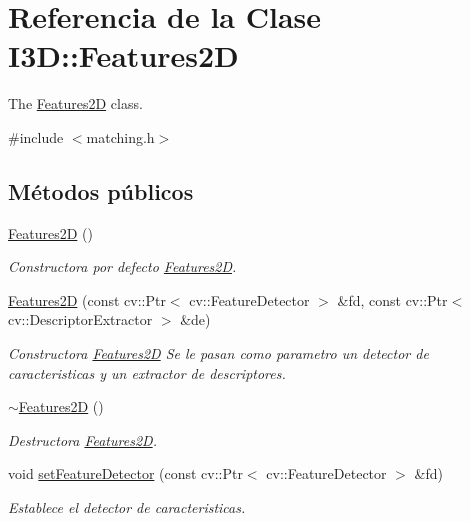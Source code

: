 \hypertarget{class_i3_d_1_1_features2_d}{}\section{Referencia de la Clase I3D\+:\+:Features2D}
\label{class_i3_d_1_1_features2_d}


The \hyperlink{class_i3_d_1_1_features2_d}{Features2D} class.  




{\ttfamily \#include $<$matching.\+h$>$}

\subsection*{Métodos públicos}
\begin{DoxyCompactItemize}
\item 
\hyperlink{class_i3_d_1_1_features2_d_a14b2aca15beaeb0bf20874246022bdf3}{Features2D} ()
\begin{DoxyCompactList}\small\item\em Constructora por defecto \hyperlink{class_i3_d_1_1_features2_d}{Features2D}. \end{DoxyCompactList}\item 
\hyperlink{class_i3_d_1_1_features2_d_a0daae1513e7dfdeb6fbed6f188a0ffb6}{Features2D} (const cv\+::\+Ptr$<$ cv\+::\+Feature\+Detector $>$ \&fd, const cv\+::\+Ptr$<$ cv\+::\+Descriptor\+Extractor $>$ \&de)
\begin{DoxyCompactList}\small\item\em Constructora \hyperlink{class_i3_d_1_1_features2_d}{Features2D} Se le pasan como parametro un detector de caracteristicas y un extractor de descriptores. \end{DoxyCompactList}\item 
\hyperlink{class_i3_d_1_1_features2_d_a0596063dc4934fb9b8768e3dd83f830a}{$\sim$\+Features2D} ()
\begin{DoxyCompactList}\small\item\em Destructora \hyperlink{class_i3_d_1_1_features2_d}{Features2D}. \end{DoxyCompactList}\item 
void \hyperlink{class_i3_d_1_1_features2_d_a7fd78be8b44ca2dcfc8bb30cec1d3743}{set\+Feature\+Detector} (const cv\+::\+Ptr$<$ cv\+::\+Feature\+Detector $>$ \&fd)
\begin{DoxyCompactList}\small\item\em Establece el detector de caracteristicas. \end{DoxyCompactList}\item 

\end{DoxyCompactItemize}
